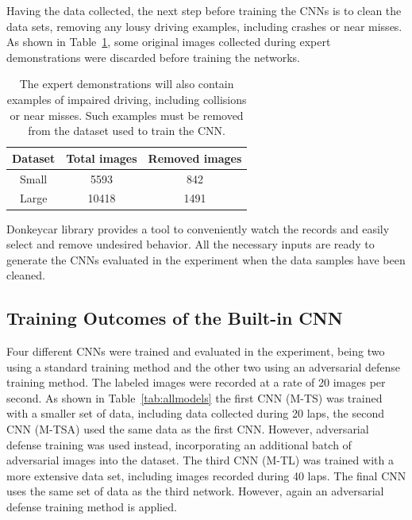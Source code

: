 \documentclass[12pt]{article}
\begin{document}
Having the data collected, the next step before training the CNNs is to clean the data sets, removing any lousy driving examples, including crashes or near misses. As shown in Table~\ref{tab:cleandata}, some original images collected during expert demonstrations were discarded before training the networks.

\begin{table}[H]
\begin{center}
\begin{tabular}{ |c|c|c| } 
\hline
Dataset & Total images & Removed images  \\
\hline
Small & 5593 & 842 \\
Large & 10418 & 1491 \\
\hline
\end{tabular}
\caption{\label{tab:cleandata}The expert demonstrations will also contain examples of impaired driving, including collisions or near misses. Such examples must be removed from the dataset used to train the CNN.}
\end{center}
\end{table}

Donkeycar library provides a tool to conveniently watch the records and easily select and remove undesired behavior. All the necessary inputs are ready to generate the CNNs evaluated in the experiment when the data samples have been cleaned. 

\subsection{Training Outcomes of the Built-in CNN}

Four different CNNs were trained and evaluated in the experiment, being two using a standard training method and the other two using an adversarial defense training method. The labeled images were recorded at a rate of 20 images per second. As shown in Table~\ref{tab:allmodels} the first CNN (M-TS) was trained with a smaller set of data, including data collected during 20 laps, the second CNN (M-TSA) used the same data as the first CNN. However, adversarial defense training was used instead, incorporating an additional batch of adversarial images into the dataset. The third CNN (M-TL) was trained with a more extensive data set, including images recorded during 40 laps. The final CNN uses the same set of data as the third network. However, again an adversarial defense training method is applied. 
\end{document}
